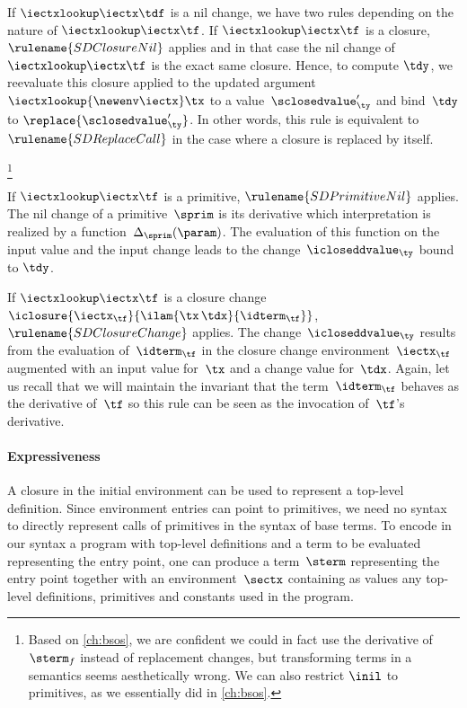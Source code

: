 If $\iectxlookup\iectx\tdf$ is a nil change, we have two rules
depending on the nature of $\iectxlookup\iectx\tf$. If
$\iectxlookup\iectx\tf$ is a closure, $\rulename{SDClosureNil}$
applies and in that case the nil change of~$\iectxlookup\iectx\tf$ is
the exact same closure. Hence, to compute $\tdy$, we reevaluate
this closure applied to the updated
argument~$\iectxlookup{\newenv\iectx}\tx$ to a
value~$\sclosedvalue'_\ty$ and bind~$\tdy$ to
$\replace{\sclosedvalue'_\ty}$. In other words, this rule is
equivalent to $\rulename{SDReplaceCall}$ in the case where a closure
is replaced by itself.%
\begin{poplForThesis}
\footnote{Based on \cref{ch:bsos}, we are confident we
could in fact use the derivative of $\sterm_f$ instead of replacement changes,
but transforming terms in a semantics seems aesthetically wrong. We can also
restrict $\inil$ to primitives, as we essentially did in \cref{ch:bsos}.}
\end{poplForThesis}
%
If $\iectxlookup\iectx\tf$ is a primitive, $\rulename{SDPrimitiveNil}$
applies. The nil change of a primitive~$\sprim$ is its derivative
which interpretation is realized by a
function~$\Delta_\sprim(\param)$.  The evaluation of this function on
the input value and the input change leads to the
change~$\icloseddvalue_\ty$ bound to $\tdy$.

If $\iectxlookup\iectx\tf$ is a closure change
$\iclosure{\iectx_\tf}{\ilam{\tx\,\tdx}{\idterm_\tf}}$,
$\rulename{SDClosureChange}$ applies. The
change~$\icloseddvalue_\ty$ results from the evaluation
of~$\idterm_\tf$ in the closure change environment~$\iectx_\tf$
augmented with an input value for~$\tx$ and a change value
for~$\tdx$. Again, let us recall that we will maintain the
invariant that the term~$\idterm_\tf$ behaves as the derivative
of~$\tf$ so this rule can be seen as the invocation of~$\tf$'s
derivative.

\paragraph{Expressiveness}

A closure in the initial environment can be used to represent a
top-level definition. Since environment entries can point to
primitives, we need no syntax to directly represent calls of
primitives in the syntax of base terms. To encode in our syntax a
program with top-level definitions and a term to be evaluated
representing the entry point, one can produce a term~$\sterm$
representing the entry point together with an environment~$\sectx$
containing as values any top-level definitions, primitives and
constants used in the program.

